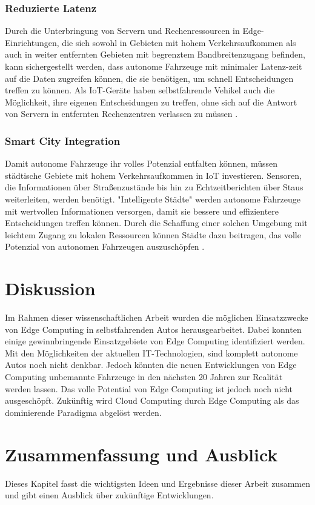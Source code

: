 \documentclass{sigchi}
\begin{document}
\subsubsection{Reduzierte Latenz}
Durch die Unterbringung von Servern und Rechenressourcen in Edge-Einrichtungen, die sich sowohl in Gebieten mit hohem Verkehrsaufkommen als auch in weiter entfernten Gebieten mit begrenztem Bandbreitenzugang befinden, kann sichergestellt werden, dass autonome Fahrzeuge mit minimaler Latenz-zeit auf die Daten zugreifen können, die sie benötigen, um schnell Entscheidungen treffen zu können. Als IoT-Geräte haben selbstfahrende Vehikel auch die Möglichkeit, ihre eigenen Entscheidungen zu treffen, ohne sich auf die Antwort von Servern in entfernten Rechenzentren verlassen zu müssen \cite{5-use-cases:2019}.

\subsubsection{Smart City Integration}
Damit autonome Fahrzeuge ihr volles Potenzial entfalten können, müssen städtische Gebiete mit hohem Verkehrsaufkommen in IoT investieren. Sensoren, die Informationen über Straßenzustände bis hin zu Echtzeitberichten über Staus weiterleiten, werden benötigt. "Intelligente Städte" werden autonome Fahrzeuge mit wertvollen Informationen versorgen, damit sie bessere und effizientere Entscheidungen treffen können. Durch die Schaffung einer solchen Umgebung mit leichtem Zugang zu lokalen Ressourcen können Städte dazu beitragen, das volle Potenzial von autonomen Fahrzeugen auszuschöpfen \cite{5-use-cases:2019}.

\section{Diskussion} \label{chap:discussion}
Im Rahmen dieser wissenschaftlichen Arbeit wurden die möglichen Einsatzzwecke von Edge Computing in selbstfahrenden Autos herausgearbeitet. Dabei konnten einige gewinnbringende Einsatzgebiete von Edge Computing identifiziert werden. Mit den Möglichkeiten der aktuellen IT-Technologien, sind komplett autonome Autos noch nicht denkbar. Jedoch könnten die neuen Entwicklungen von Edge Computing unbemannte Fahrzeuge in den nächsten 20 Jahren zur Realität werden lassen. Das volle Potential von Edge Computing ist jedoch noch nicht ausgeschöpft. Zukünftig wird Cloud Computing durch Edge Computing als das dominierende Paradigma abgelöst werden.

\section{Zusammenfassung und Ausblick} \label{chap:summary}
Dieses Kapitel fasst die wichtigsten Ideen und Ergebnisse dieser Arbeit zusammen und gibt einen Ausblick über zukünftige Entwicklungen.
\end{document}
